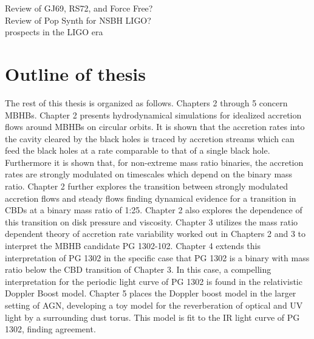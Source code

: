 

Review of GJ69, RS72, and Force Free?\\



Review of Pop Synth for NSBH LIGO?\\
prospects in the LIGO era









\section{Outline of thesis}  
The rest of this thesis is organized as follows.
Chapters 2 through 5 concern MBHBs. Chapter 2 presents hydrodynamical
simulations for idealized accretion flows around MBHBs on circular orbits. It
is shown that the accretion rates into the cavity cleared by the black holes
is traced by accretion streams which can feed the black holes at a rate
comparable to that of a single black hole. Furthermore it is shown that, for
non-extreme mass ratio binaries, the accretion rates are strongly modulated on
timescales which depend on the binary mass ratio. Chapter 2 further explores
the transition between strongly modulated accretion flows and steady flows
finding dynamical evidence for a transition in CBDs at a binary mass ratio of
1:25. Chapter 2 also explores the dependence of this transition on disk
pressure and viscosity. Chapter 3 utilizes the mass ratio dependent theory of
accretion rate variability worked out in Chapters 2 and 3 to interpret the
MBHB candidate PG 1302-102. Chapter 4 extends this interpretation of PG 1302
in the specific case that PG 1302 is a binary with mass ratio below the CBD
transition of Chapter 3. In this case, a compelling interpretation for the
periodic light curve of PG 1302 is found in the relativistic Doppler Boost
model. Chapter 5 places the Doppler boost model in the larger setting of AGN,
developing a toy model for the reverberation of optical and UV light by a
surrounding dust torus. This model is fit to the IR light curve of PG 1302,
finding agreement.

